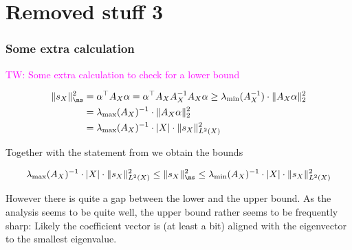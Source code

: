 \documentclass[a4paper, 10pt]{article}
\newcommand{\tw}[1]{\textcolor{magenta}{TW: #1}}
\begin{document}
\section{Removed stuff 3}

\subsubsection{Some extra calculation}

\tw{Some extra calculation to check for a lower bound}

\begin{align*}
\Vert s_X \Vert_{\ns}^2 &= \alpha^\top A_{X} \alpha = \alpha^\top A_{X} A_{X}^{-1} A_{X} \alpha 
\geq \lambda_{\min}(A_X^{-1}) \cdot \Vert A_X \alpha \Vert_{2}^2 \\
&= \lambda_{\max}(A_X)^{-1} \cdot \Vert A_X \alpha \Vert_{2}^2 \\
& = \lambda_{\max}(A_X)^{-1} \cdot |X| \cdot \Vert s_X \Vert_{L^2(X)}^2
\end{align*}

Together with the statement from  we obtain the bounds

\begin{align*}
\lambda_{\max}(A_X)^{-1} \cdot |X| \cdot \Vert s_X \Vert_{L^2(X)}^2 \leq \Vert s_X \Vert_{\ns}^2 \leq \lambda_{\min}(A_X)^{-1} \cdot |X| \cdot \Vert s_X \Vert_{L^2(X)}^2
\end{align*}

However there is quite a gap between the lower and the upper bound.
As the analysis  seems to be quite well, the upper bound rather seems to be frequently sharp: 
Likely the coefficient vector is (at least a bit) aligned with the eigenvector to the smallest eigenvalue.

\else
\fi





\newpage
\end{document}

